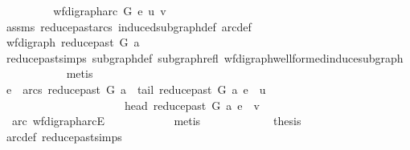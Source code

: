 \begin{isabellebody}
\ \ \ \ \ \ \isamarkupfalse%
\ \isamarkupfalse%
\ {\isachardoublequoteopen}{\isacharparenleft}{\kern0pt}wf{\isacharunderscore}{\kern0pt}digraph{\isachardot}{\kern0pt}arc\ G\ e\ {\isacharparenleft}{\kern0pt}u{\isacharcomma}{\kern0pt}\ v{\isacharparenright}{\kern0pt}{\isacharparenright}{\kern0pt}{\isachardoublequoteclose}\isanewline
\ \ \ \ \ \ \ \ \isamarkupfalse%
\ assms\ reduce{\isacharunderscore}{\kern0pt}past{\isacharunderscore}{\kern0pt}arcs{}\ induced{\isacharunderscore}{\kern0pt}subgraph{\isacharunderscore}{\kern0pt}def\ arc{\isacharunderscore}{\kern0pt}def\ \isanewline
\ \ \ \ \ \ \isamarkupfalse%
\ {\isacharminus}{\kern0pt}\isanewline
\ \ \ \ \ \ \ \ \isamarkupfalse%
\ {\isachardoublequoteopen}wf{\isacharunderscore}{\kern0pt}digraph\ {\isacharparenleft}{\kern0pt}reduce{\isacharunderscore}{\kern0pt}past\ G\ a{\isacharparenright}{\kern0pt}{\isachardoublequoteclose}\isanewline
\ \ \ \ \ \ \ \ \ \ \isamarkupfalse%
\ reduce{\isacharunderscore}{\kern0pt}past{\isachardot}{\kern0pt}simps\ subgraph{\isacharunderscore}{\kern0pt}def\ subgraph{\isacharunderscore}{\kern0pt}refl\ wf{\isacharunderscore}{\kern0pt}digraph{\isachardot}{\kern0pt}wellformed{\isacharunderscore}{\kern0pt}induce{\isacharunderscore}{\kern0pt}subgraph\isanewline
\ \ \ \ \ \ \ \ \ \ \isamarkupfalse%
\ metis\isanewline
\ \ \ \ \ \ \ \ \isamarkupfalse%
\ \isamarkupfalse%
\ {\isachardoublequoteopen}e\ {\isasymin}\ arcs\ {\isacharparenleft}{\kern0pt}reduce{\isacharunderscore}{\kern0pt}past\ G\ a{\isacharparenright}{\kern0pt}\ {\isasymand}\ tail\ {\isacharparenleft}{\kern0pt}reduce{\isacharunderscore}{\kern0pt}past\ G\ a{\isacharparenright}{\kern0pt}\ e\ {\isacharequal}{\kern0pt}\ u\isanewline
\ \ \ \ \ \ \ \ \ \ \ \ \ \ \ \ \ \ \ \ \ {\isasymand}\ head\ {\isacharparenleft}{\kern0pt}reduce{\isacharunderscore}{\kern0pt}past\ G\ a{\isacharparenright}{\kern0pt}\ e\ {\isacharequal}{\kern0pt}\ v{\isachardoublequoteclose}\isanewline
\ \ \ \ \ \ \ \ \ \ \isamarkupfalse%
\ \ arc\ wf{\isacharunderscore}{\kern0pt}digraph{\isachardot}{\kern0pt}arcE\isanewline
\ \ \ \ \ \ \ \ \ \ \isamarkupfalse%
\ metis\ \isanewline
\ \ \ \ \ \ \ \ \isamarkupfalse%
\ \isamarkupfalse%
\ {\isacharquery}{\kern0pt}thesis\isanewline
\ \ \ \ \ \ \ \ \ \ \isamarkupfalse%
\ arc{\isacharunderscore}{\kern0pt}def\ reduce{\isacharunderscore}{\kern0pt}past{\isachardot}{\kern0pt}simps\ \isamarkupfalse%

\end{isabellebody}
